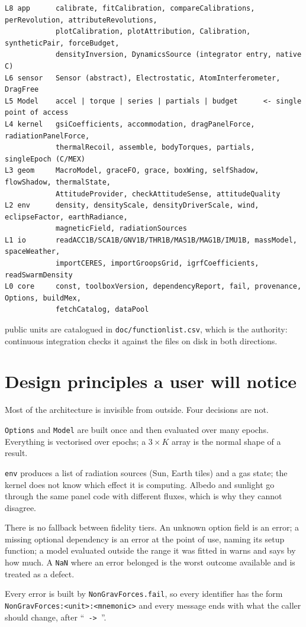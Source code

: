 \documentclass[11pt,a4paper]{report}
\begin{document}
\begin{lstlisting}
L8 app      calibrate, fitCalibration, compareCalibrations, perRevolution, attributeRevolutions,
            plotCalibration, plotAttribution, Calibration, syntheticPair, forceBudget,
            densityInversion, DynamicsSource (integrator entry, native C)
L6 sensor   Sensor (abstract), Electrostatic, AtomInterferometer, DragFree
L5 Model    accel | torque | series | partials | budget      <- single point of access
L4 kernel   gsiCoefficients, accommodation, dragPanelForce, radiationPanelForce,
            thermalRecoil, assemble, bodyTorques, partials, singleEpoch (C/MEX)
L3 geom     MacroModel, graceFO, grace, boxWing, selfShadow, flowShadow, thermalState,
            AttitudeProvider, checkAttitudeSense, attitudeQuality
L2 env      density, densityScale, densityDriverScale, wind, eclipseFactor, earthRadiance,
            magneticField, radiationSources
L1 io       readACC1B/SCA1B/GNV1B/THR1B/MAS1B/MAG1B/IMU1B, massModel, spaceWeather,
            importCERES, importGroopsGrid, igrfCoefficients, readSwarmDensity
L0 core     const, toolboxVersion, dependencyReport, fail, provenance, Options, buildMex,
            fetchCatalog, dataPool
\end{lstlisting}

\noindent \ngfunitcount{} public units are catalogued in \texttt{doc/functionlist.csv}, which is the
authority: continuous integration checks it against the files on disk in both directions.

\section{Design principles a user will notice}
Most of the architecture is invisible from outside. Four decisions are not.

\begin{description}[leftmargin=1.4em,style=nextline]
\item[Configure once, evaluate many.] \texttt{Options} and \texttt{Model} are built once and then
 evaluated over many epochs. Everything is vectorised over epochs; a $3\times K$ array is the
 normal shape of a result.
\item[Sources, not effects.] \texttt{env} produces a list of radiation sources (Sun, Earth tiles)
 and a gas state; the kernel does not know which effect it is computing. Albedo and sunlight go
 through the same panel code with different fluxes, which is why they cannot disagree.
\item[Never degrade silently.] There is no fallback between fidelity tiers. An unknown option field
 is an error; a missing optional dependency is an error at the point of use, naming its setup
 function; a model evaluated outside the range it was fitted in warns and says by how much. A
 \texttt{NaN} where an error belonged is the worst outcome available and is treated as a defect.
\item[One raise point.] Every error is built by \texttt{NonGravForces.fail}, so every identifier has
 the form \texttt{NonGravForces:<unit>:<mnemonic>} and every message ends with what the caller
 should change, after ``\texttt{ -> }''.
\end{description}
\end{document}
